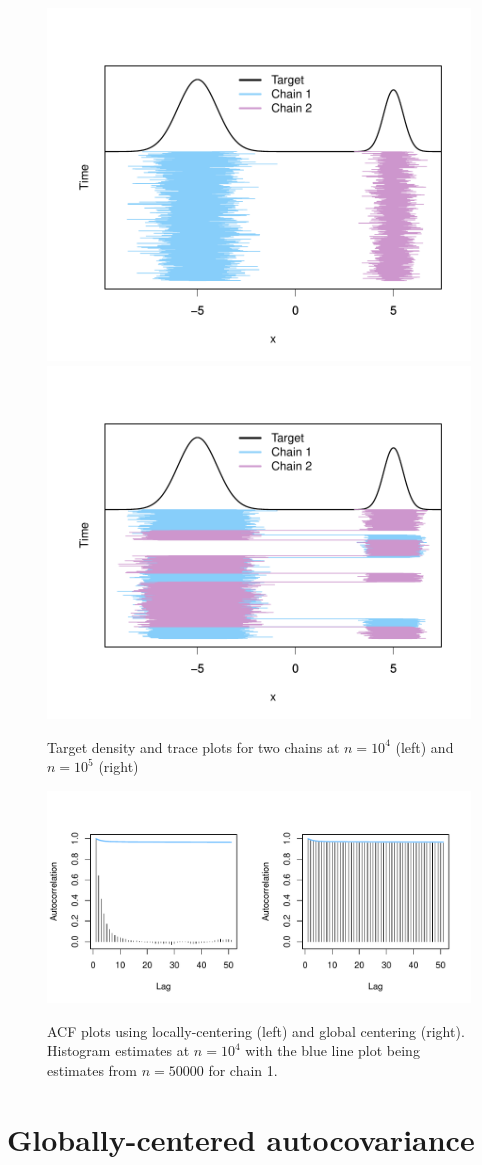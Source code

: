 \documentclass[11pt]{article}
\theoremstyle{remark}
\begin{document}
\begin{figure}[htbp]
\centering
   \includegraphics[width=.35\linewidth]{plots/gaussian-Targettrace_n1e4.pdf}
    \includegraphics[width=.35\linewidth]{plots/gaussian-Targettrace_n1e5.pdf} 
    \caption{Target density and trace plots for two chains at $n = 10^4$ (left) and $n = 10^5$ (right)}
    \label{fig:gaussian-trace}
\end{figure}



\begin{figure}[htbp]
\centering
\includegraphics[width=.6\textwidth]{plots/gaussian-acf_hist.pdf} \\

\caption{ACF plots using locally-centering (left) and global centering (right). Histogram estimates at $n = 10^4$ with the blue line plot being estimates from $n = 50000$ for chain 1.}
\label{fig:gaussian-acf}
\end{figure}


\section{Globally-centered autocovariance} \label{sec:G-ACF}
\end{document}
